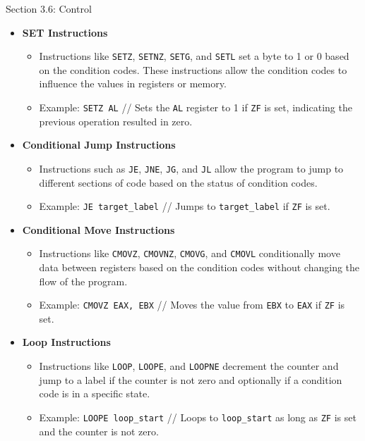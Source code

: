 \begin{notes}{Section 3.6: Control}
    \begin{itemize}
        \item \textbf{SET Instructions}
        \begin{itemize}
            \item Instructions like \texttt{SETZ}, \texttt{SETNZ}, \texttt{SETG}, and \texttt{SETL} set a byte to 1 or 0 based on the condition codes. These instructions allow the condition codes to 
            influence the values in registers or memory.
            \item Example: \texttt{SETZ AL} // Sets the \texttt{AL} register to 1 if \texttt{ZF} is set, indicating the previous operation resulted in zero.
        \end{itemize}
        \item \textbf{Conditional Jump Instructions}
        \begin{itemize}
            \item Instructions such as \texttt{JE}, \texttt{JNE}, \texttt{JG}, and \texttt{JL} allow the program to jump to different sections of code based on the status of condition codes.
            \item Example: \texttt{JE target\_label} // Jumps to \texttt{target\_label} if \texttt{ZF} is set.
        \end{itemize}
        \item \textbf{Conditional Move Instructions}
        \begin{itemize}
            \item Instructions like \texttt{CMOVZ}, \texttt{CMOVNZ}, \texttt{CMOVG}, and \texttt{CMOVL} conditionally move data between registers based on the condition codes without changing the flow 
            of the program.
            \item Example: \texttt{CMOVZ EAX, EBX} // Moves the value from \texttt{EBX} to \texttt{EAX} if \texttt{ZF} is set.
        \end{itemize}
        \item \textbf{Loop Instructions}
        \begin{itemize}
            \item Instructions like \texttt{LOOP}, \texttt{LOOPE}, and \texttt{LOOPNE} decrement the counter and jump to a label if the counter is not zero and optionally if a condition code is in a 
            specific state.
            \item Example: \texttt{LOOPE loop\_start} // Loops to \texttt{loop\_start} as long as \texttt{ZF} is set and the counter is not zero.
        \end{itemize}
    \end{itemize}
    

\end{notes}
